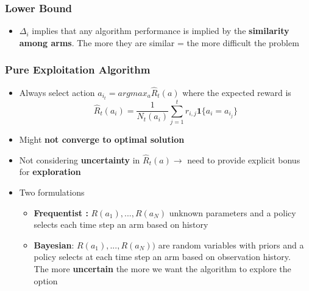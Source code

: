 \documentclass[12pt]{article} %
\begin{document}
\subsubsection{Lower Bound}
\begin{itemize}
\item $\Delta_i $ implies that any algorithm performance is implied by the \textbf{similarity among arms}. The more they are similar = the more difficult the problem

\begin{center}
\end{center}
\end{itemize}

\subsubsection{Pure Exploitation Algorithm}
\begin{itemize}
\item Always select action $a_{i_t} =argmax_a \hat{R}_t(a)$ where the expected reward is 
$$ \hat{R}_t(a_i)= \frac{1}{N_t(a_i)} \sum_{j=1}^t r_{i,j} \bm{1}\{a_i =a_{i_j} \}$$

\item Might \textbf{not converge to optimal solution}
\item Not considering \textbf{uncertainty} in $\hat{R}_t(a) \rightarrow$ need to provide explicit bonus for \textbf{exploration}
\item Two formulations
\begin{itemize}
\item \textbf{Frequentist :} $R(a_1),...,R(a_N)$ unknown parameters and a policy selects each time step an arm	based on history
\item \textbf{Bayesian}: $R(a_1),...,R(a_N))$ are random variables with priors and a policy selects at each time step an arm based on	observation history.\\
The more \textbf{uncertain} the more we want the algorithm to explore the option
\end{itemize}
\end{itemize}
\end{document}

